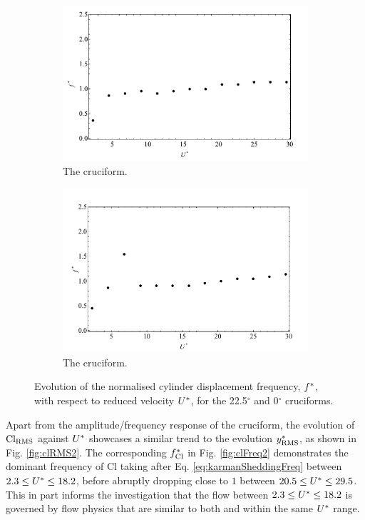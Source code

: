 \documentclass[oneside]{utmthesis}
\begin{document}
\begin{figure}
  \centering
  \begin{subfigure}[h]{1\textwidth}
    \includegraphics[width=\textwidth]{figs/yStrFreq2}
    \caption{The \angtw{} cruciform.}
    \label{fig:yStrFreq2}
  \end{subfigure}
  
  \begin{subfigure}[h]{1\textwidth}
    \includegraphics[width=\textwidth]{figs/yStrFreq1}
    \caption{The \angon{} cruciform.}
    \label{fig:yStrFreq1}
  \end{subfigure}

  \caption{Evolution of the normalised cylinder displacement frequency, $f^{*}$, with respect to reduced velocity $U^{*}$, for the 22.5$^{\circ}$ and 0$^{\circ}$ cruciforms.}
  \label{fig:yStrFreq21}
\end{figure}

Apart from the amplitude/frequency response of the \angtw{} cruciform, the evolution of $\text{Cl}_{\text{RMS}}$ against $U^{*}$ showcases a similar trend to the evolution $y^{*}_{\text{RMS}}$, as shown in Fig. \ref{fig:clRMS2}. The corresponding $f_{\text{Cl}}^{*}$ in Fig. \ref{fig:clFreq2} demonstrates the dominant frequency of Cl taking after Eq. \ref{eq:karmanSheddingFreq} between $2.3 \leq U^{*} \leq 18.2$, before abruptly dropping close to $1$ between $20.5 \leq U^{*} \leq 29.5$. This in part informs the investigation that the flow between $2.3 \leq U^{*} \leq 18.2$ is governed by flow physics that are similar to both \angfo{} and \angth{} within the same $U^{*}$ range.
\end{document}
